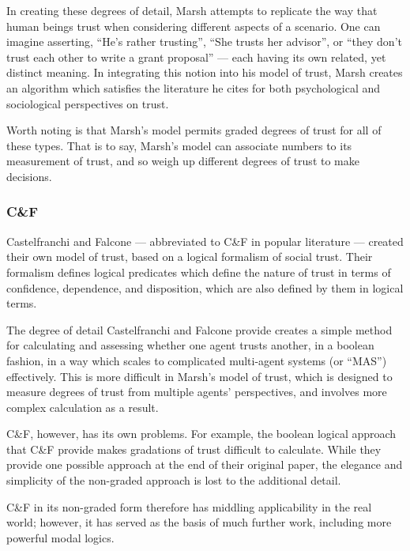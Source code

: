 In creating these degrees of detail, Marsh attempts to replicate the way that human beings trust when considering different aspects of a scenario. One can imagine asserting, ``He's rather trusting'', ``She trusts her advisor'', or ``they don't trust each other to write a grant proposal'' --- each having its own related, yet distinct meaning. In integrating this notion into his model of trust, Marsh creates an algorithm which satisfies the literature he cites for both psychological and sociological perspectives on trust.\par

Worth noting is that Marsh's model permits graded degrees of trust for all of these types. That is to say, Marsh's model can associate numbers to its measurement of trust, and so weigh up different degrees of trust to make decisions.\par

\subsubsection*{C\&F}\label{sec:cnf}
Castelfranchi and Falcone\cite{Castelfranchi2001} --- abbreviated to C\&F in popular literature --- created their own model of trust, based on a logical formalism of social trust. Their formalism defines logical predicates which define the nature of trust in terms of confidence, dependence, and disposition, which are also defined by them in logical terms.\par

The degree of detail Castelfranchi and Falcone provide creates a simple method for calculating and assessing whether one agent trusts another, in a boolean fashion, in a way which scales to complicated multi-agent systems (or ``MAS'') effectively. This is more difficult in Marsh's model of trust, which is designed to measure degrees of trust from multiple agents' perspectives, and involves more complex calculation as a result.\par

C\&F, however, has its own problems. For example, the boolean logical approach that C\&F provide makes gradations of trust difficult to calculate. While they provide one possible approach at the end of their original paper, the elegance and simplicity of the non-graded approach is lost to the additional detail.\par

C\&F in its non-graded form therefore has middling applicability in the real world; however, it has served as the basis of much further work\cite{Herzig2009}, including more powerful modal logics.\cite{kramdi}\par

